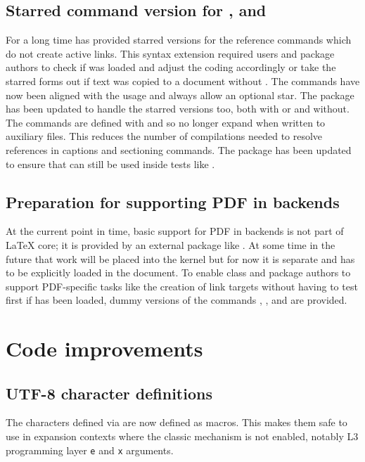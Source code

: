 \documentclass{ltnews}
\begin{document}
\subsection{Starred command version for ,  and }

For a long time  has provided starred versions for the reference commands
which do not create active links. This syntax extension required users and
package authors to check if  was loaded and adjust the coding
accordingly or take the starred forms out if text was copied to a document
without . The commands have now been aligned with
the  usage and always allow an optional star. The  package
has been updated to handle the starred versions too, both with  or 
and without. The commands are defined with  and so no longer expand when
written to auxiliary files. This reduces the number of compilations needed to resolve references
in captions and sectioning commands. The package  has been updated to ensure that
 can still be used inside tests like .


\subsection{Preparation for supporting PDF in backends}

At the current point in time, basic support for PDF in
backends is not part of \LaTeX{} core; it is provided by an external
package like .
At some time in the future that work will be placed
into the kernel but for now it is separate and has to be
explicitly loaded in the document. To enable class and package authors
to support PDF-specific tasks like the creation of link targets without
having to test first if  has been loaded, dummy versions of
the commands , ,  and
 are provided.

\section{Code improvements}

\subsection{ UTF-8 character definitions}
The characters defined via  are now defined as 
macros. This makes them safe to use in expansion contexts where the
classic  mechanism is not enabled, notably L3 programming
layer \texttt{e} and \texttt{x} arguments.
\end{document}
